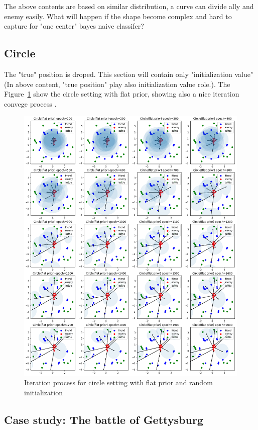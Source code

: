 \documentclass{article}
\begin{document}
The above contents are based on similar distribution, a curve can divide ally and enemy easily.
What will happen if the shape become complex and hard to capture for "one center" bayes naive classifer?

\subsection{Circle}

The "true" position is droped. This section will contain only "initialization value"
(In above content, "true position" play also initialization value role.). 
The Figure~\ref{fig:circleIteration} show the circle setting with flat prior, 
showing also a nice iteration convege process .


\begin{figure}[h]
\includegraphics[width=0.99\linewidth]{circle_iteration.png}
\caption{Iteration process for circle setting with flat prior and random initialization}
\label{fig:circleIteration}
\end{figure}

\subsection{Case study: The battle of Gettysburg}
\end{document}
